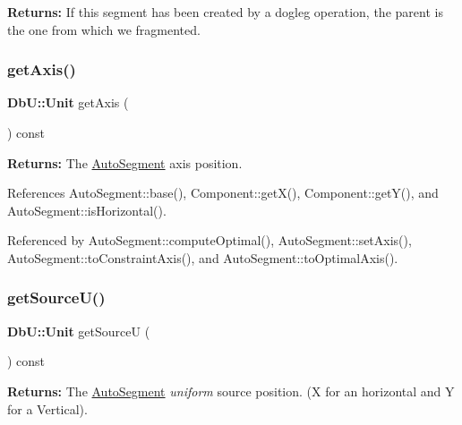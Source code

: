 {\bfseries Returns\+:} If this segment has been created by a dogleg operation, the parent is the one from which we fragmented. \mbox{\label{classKatabatic_1_1AutoSegment_ab5b5aaa5b318369feee6003dbad039c2}} 
\subsubsection{\texorpdfstring{get\+Axis()}{getAxis()}}
{\footnotesize\ttfamily \textbf{ Db\+U\+::\+Unit} get\+Axis (\begin{DoxyParamCaption}{ }\end{DoxyParamCaption}) const\hspace{0.3cm}{\ttfamily [inline]}}

{\bfseries Returns\+:} The \mbox{\hyperlink{classKatabatic_1_1AutoSegment}{Auto\+Segment}} axis position. 

References Auto\+Segment\+::base(), Component\+::get\+X(), Component\+::get\+Y(), and Auto\+Segment\+::is\+Horizontal().



Referenced by Auto\+Segment\+::compute\+Optimal(), Auto\+Segment\+::set\+Axis(), Auto\+Segment\+::to\+Constraint\+Axis(), and Auto\+Segment\+::to\+Optimal\+Axis().

\mbox{\label{classKatabatic_1_1AutoSegment_aeaa1543880686755e389c4807128428f}} 
\subsubsection{\texorpdfstring{get\+Source\+U()}{getSourceU()}}
{\footnotesize\ttfamily \textbf{ Db\+U\+::\+Unit} get\+SourceU (\begin{DoxyParamCaption}{ }\end{DoxyParamCaption}) const\hspace{0.3cm}{\ttfamily [pure virtual]}}

{\bfseries Returns\+:} The \mbox{\hyperlink{classKatabatic_1_1AutoSegment}{Auto\+Segment}} {\itshape uniform} source position. (X for an horizontal and Y for a Vertical). 

